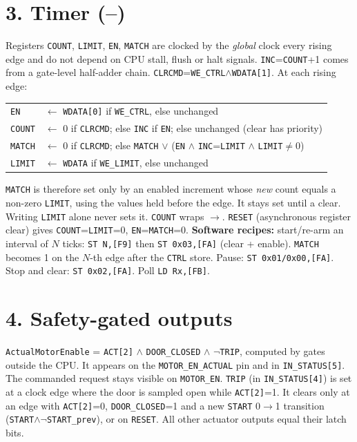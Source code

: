 \documentclass[10pt,a4paper]{article}
\begin{document}
\section*{3. Timer (--)}
Registers \texttt{COUNT}, \texttt{LIMIT}, \texttt{EN}, \texttt{MATCH} are clocked by the \emph{global} clock every rising
edge and do not depend on CPU stall, flush or halt signals. \texttt{INC}=\texttt{COUNT}+1 comes from a gate-level
half-adder chain. \texttt{CLRCMD}=\texttt{WE\_CTRL}$\wedge$\texttt{WDATA[1]}. At each rising edge:
\begin{center}\small
\begin{tabular}{l l}
\texttt{EN}    & $\leftarrow$ \texttt{WDATA[0]} if \texttt{WE\_CTRL}, else unchanged\\
\texttt{COUNT} & $\leftarrow$ 0 if \texttt{CLRCMD}; else \texttt{INC} if \texttt{EN}; else unchanged \qquad (clear has priority)\\
\texttt{MATCH} & $\leftarrow$ 0 if \texttt{CLRCMD}; else \texttt{MATCH} $\vee$ (\texttt{EN} $\wedge$ \texttt{INC}=\texttt{LIMIT} $\wedge$ \texttt{LIMIT}$\neq$0)\\
\texttt{LIMIT} & $\leftarrow$ \texttt{WDATA} if \texttt{WE\_LIMIT}, else unchanged\\
\end{tabular}
\end{center}
\texttt{MATCH} is therefore set only by an enabled increment whose \emph{new} count equals a non-zero \texttt{LIMIT}, using
the values held before the edge. It stays set until a clear. Writing \texttt{LIMIT} alone never sets it. \texttt{COUNT} wraps
$\rightarrow$. \texttt{RESET} (asynchronous register clear) gives \texttt{COUNT}=\texttt{LIMIT}=0,
\texttt{EN}=\texttt{MATCH}=0.
\textbf{Software recipes:} start/re-arm an interval of $N$ ticks: \texttt{ST N,[F9]} then \texttt{ST 0x03,[FA]} (clear +
enable). \texttt{MATCH} becomes 1 on the $N$-th edge after the \texttt{CTRL} store. Pause: \texttt{ST 0x01/0x00,[FA]}.
Stop and clear: \texttt{ST 0x02,[FA]}. Poll \texttt{LD Rx,[FB]}.

\section*{4. Safety-gated outputs}
\texttt{ActualMotorEnable} = \texttt{ACT[2]} $\wedge$ \texttt{DOOR\_CLOSED} $\wedge$ $\lnot$\texttt{TRIP}, computed by
gates outside the CPU. It appears on the \texttt{MOTOR\_EN\_ACTUAL} pin and in \texttt{IN\_STATUS[5]}. The commanded request
stays visible on \texttt{MOTOR\_EN}. \texttt{TRIP} (in \texttt{IN\_STATUS[4]}) is set at a clock edge where the door
is sampled open while \texttt{ACT[2]}=1. It clears only at an edge with \texttt{ACT[2]}=0, \texttt{DOOR\_CLOSED}=1 and a
new \texttt{START} 0$\rightarrow$1 transition (\texttt{START}$\wedge\lnot$\texttt{START\_prev}), or on \texttt{RESET}.
All other actuator outputs equal their latch bits.
\end{document}
